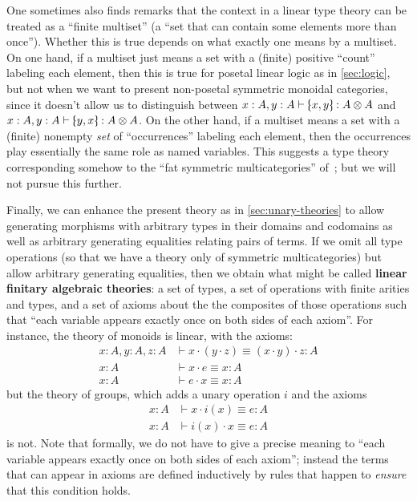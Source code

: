 \documentclass{book}
\let\types\vdash
\let\tensor\otimes
\def\tpair#1#2{\text{\textlquill} #1,#2 \text{\textrquill}}%
\begin{document}
One sometimes also finds remarks that the context in a linear type theory can be treated as a ``finite multiset'' (a ``set that can contain some elements more than once'').
Whether this is true depends on what exactly one means by a multiset.
On one hand, if a multiset just means a set with a (finite) positive ``count'' labeling each element, then this is true for posetal linear logic as in \cref{sec:logic}, but not when we want to present non-posetal symmetric monoidal categories, since it doesn't allow us to distinguish between $x:A,y:A \types \tpair x y:A\tensor A$ and $x:A,y:A \types \tpair y x:A\tensor A$.
On the other hand, if a multiset means a set with a (finite) nonempty \emph{set} of ``occurrences'' labeling each element, then the occurrences play essentially the same role as named variables.
This suggests a type theory corresponding somehow to the ``fat symmetric multicategories'' of~\cite[Appendix A]{leinster:higher-opds}; but we will not pursue this further.

Finally, we can enhance the present theory as in \cref{sec:unary-theories} to allow generating morphisms with arbitrary types in their domains and codomains as well as arbitrary generating equalities relating pairs of terms.
If we omit all type operations (so that we have a theory only of symmetric multicategories) but allow arbitrary generating equalities, then we obtain what might be called \textbf{linear finitary algebraic theories}: a set of types, a set of operations with finite arities and types, and a set of axioms about the the composites of those operations such that ``each variable appears exactly once on both sides of each axiom''.
For instance, the theory of monoids is linear, with the axioms:
\begin{align*}
  x:A,y:A,z:A &\types x\cdot (y\cdot z) \equiv (x\cdot y)\cdot z :A\\
  x:A &\types x\cdot e \equiv x:A\\
  x:A &\types e\cdot x \equiv x:A
\end{align*}
but the theory of groups, which adds a unary operation $i$ and the axioms
\begin{align*}
  x:A &\types x\cdot i(x) \equiv e:A \\
  x:A &\types i(x)\cdot x \equiv e:A
\end{align*}
is not.
Note that formally, we do not have to give a precise meaning to ``each variable appears exactly once on both sides of each axiom''; instead the terms that can appear in axioms are defined inductively by rules that happen to \emph{ensure} that this condition holds.
\end{document}
